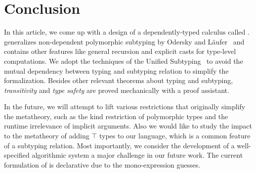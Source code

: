\section{Conclusion}

In this article, we come up with a design of a dependently-typed calculus called \name.
\name generalizes non-dependent polymorphic subtyping by Odersky and
L\"aufer~\cite{odersky1996putting} and contains other features like general
recursion and explicit casts for type-level computations.
We adopt the techniques of the Unified Subtyping~\cite{yang2017unifying} to
avoid the mutual dependency between typing and subtyping relation to simplify
the formalization. Besides other relevant theorems about typing and subtyping,
\emph{transitivity} and \emph{type safety} are proved mechanically with a proof assistant.

In the future, we will attempt to lift various restrictions that originally simplify
the metatheory, such as the kind restriction of polymorphic
types and the runtime irrelevance of implicit arguments. Also we would like to
study the impact to the metatheory of adding $\top$ types to our language,
which is a common feature of a subtyping relation.
Most importantly, we consider the development
of a well-specified algorithmic system a major challenge in our future
work. The current formulation of \name is declarative due to the mono-expression guesses.
